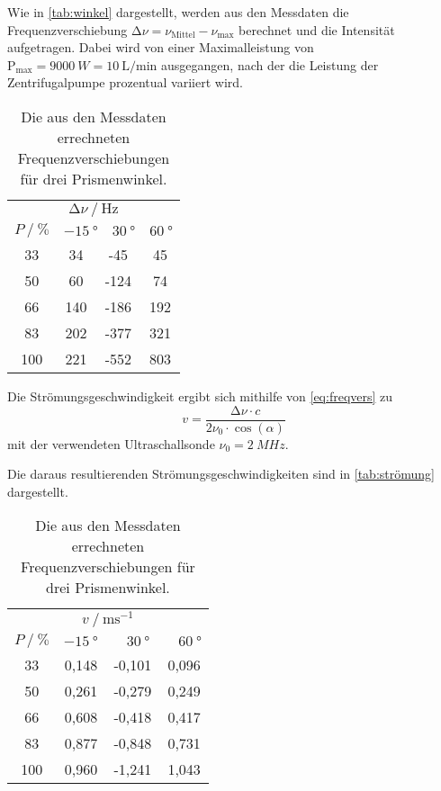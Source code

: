 Wie in \autoref{tab:winkel} dargestellt, werden aus den Messdaten die Frequenzverschiebung 
$\increment \nu = \nu_\text{Mittel} - \nu_\text{max}$ berechnet und die Intensität aufgetragen.
Dabei wird von einer Maximalleistung von $\text{P}_\text{max} = \qty{9000}{W} = \qty{10}{\liter\per\minute}$ ausgegangen, 
nach der die Leistung der Zentrifugalpumpe prozentual variiert wird.
\begin{table}
  \centering
  \caption{Die aus den Messdaten errechneten Frequenzverschiebungen für drei Prismenwinkel.}
  \label{tab:winkel}
  \begin{tabular}{c c c c}
    \toprule
    \multicolumn{4}{c}{$\increment \nu \mathbin{/} \mathrm{Hz}$} \\
    \cmidrule(lr){1-4}
    
    \multicolumn{1}{c}{$P \mathbin{/} \% $} &
    \multicolumn{3}{c}{$-\qty{15}{°} \quad \qty{30}{°} \quad \qty{60}{°}$} \\
    \cmidrule(lr){1-1}\cmidrule(lr){2-4}

       33 &  34 &  -45 &  45 \\
       50 &  60 & -124 &  74 \\
       66 & 140 & -186 & 192 \\
       83 & 202 & -377 & 321 \\
      100 & 221 & -552 & 803 \\
    \bottomrule
  \end{tabular}
\end{table}

Die Strömungsgeschwindigkeit ergibt sich mithilfe von \autoref{eq:freqvers} zu
\begin{equation}
  v = \frac{\increment \nu \cdot c}{2 \nu_0 \cdot \cos (\alpha)}
\end{equation}
mit der verwendeten Ultraschallsonde $\nu_0 = \qty{2}{MHz}$.

Die daraus resultierenden Strömungsgeschwindigkeiten sind in \autoref{tab:strömung} dargestellt.
\begin{table}
  \centering
  \caption{Die aus den Messdaten errechneten Frequenzverschiebungen für drei Prismenwinkel.}
  \label{tab:strömung}
  \begin{tabular}{c c c c}
    \toprule
    \multicolumn{4}{c}{$v \mathbin{/} \mathrm{ms^{-1}}$} \\
    \cmidrule(lr){1-4}
    
    \multicolumn{1}{c}{$P \mathbin{/} \% $} &
    \multicolumn{3}{c}{$-\qty{15}{°} \qquad \qty{30}{°} \qquad \qty{60}{°}$} \\
    \cmidrule(lr){1-1}\cmidrule(lr){2-4}

       33 & 0,148 &   -0,101 &    0,096 \\
       50 & 0,261 &   -0,279 &    0,249 \\
       66 & 0,608 &   -0,418 &    0,417 \\
       83 & 0,877 &   -0,848 &    0,731 \\
      100 & 0,960 &   -1,241 &    1,043 \\
    \bottomrule
  \end{tabular}
\end{table}

